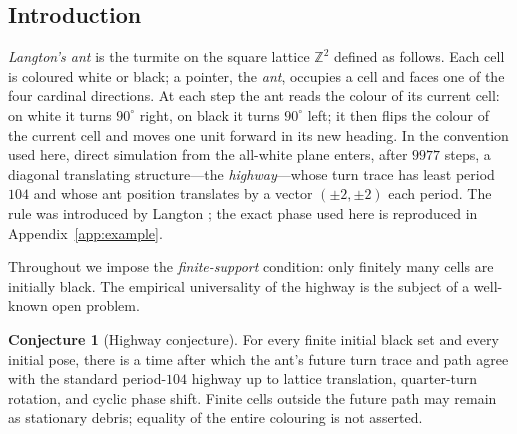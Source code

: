 \documentclass[11pt,letterpaper]{article}
\theoremstyle{plain}
\theoremstyle{definition}
\newtheorem{conjecture}[theorem]{Conjecture}
\newcommand{\Z}{\mathbb{Z}}
\begin{document}
\begin{NoHyper}
\section{Introduction}

\emph{Langton's ant} is the turmite on the square lattice $\Z^2$ defined as
follows. Each cell is coloured white or black; a pointer, the \emph{ant}, occupies
a cell and faces one of the four cardinal directions. At each step the ant reads
the colour of its current cell: on white it turns $90^\circ$ right, on black it
turns $90^\circ$ left; it then flips the colour of the current cell and moves one
unit forward in its new heading. In the convention used here, direct simulation from
the all-white plane enters, after $9977$ steps, a diagonal translating
structure---the \emph{highway}---whose turn trace has least period $104$ and whose
ant position translates by a vector $(\pm2,\pm2)$ each period. The rule was
introduced by Langton \cite{Langton1986}; the exact phase used here is reproduced in
Appendix~\ref{app:example}.

Throughout we impose the \emph{finite-support} condition: only finitely many cells
are initially black. The empirical universality of the highway is the subject of a
well-known open problem.

\begin{conjecture}[Highway conjecture]\label{conj:main}
For every finite initial black set and every initial pose, there is a time after which
the ant's future turn trace and path agree with the standard period-$104$ highway up
to lattice translation, quarter-turn rotation, and cyclic phase shift. Finite cells
outside the future path may remain as stationary debris; equality of the entire
colouring is not asserted.
\end{conjecture}


\end{NoHyper}
\end{document}
